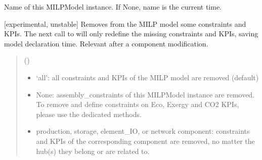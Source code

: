 \documentclass[letterpaper,10pt,english]{sphinxmanual}
\begin{document}
\begin{fulllineitems}
\begin{fulllineitems}
\end{fulllineitems}


\begin{fulllineitems}
\label{\detokenize{generated/tamos.MILPModel:tamos.MILPModel.name}}
\pysigstartsignatures
{}
\pysigstopsignatures
\sphinxAtStartPar
Name of this MILPModel instance. If None, name is the current time.

\end{fulllineitems}


\begin{fulllineitems}
\label{\detokenize{generated/tamos.MILPModel:tamos.MILPModel.remove_constraints_and_KPIs}}
\pysigstartsignatures
{}
\pysigstopsignatures
\sphinxAtStartPar
{[}experimental, unstable{]}
Removes from the MILP model some constraints and KPIs. The next call to 
will only redefine the missing constraints and KPIs, saving model declaration time.
Relevant after a component modification.
\begin{quote}\begin{description}
\sphinxAtStartPar
{} () \textendash{} \begin{itemize}
\item {} 
\sphinxAtStartPar
‘all’: all constraints and KPIs of the MILP model are removed (default)

\item {} 
\sphinxAtStartPar
None: assembly\_constraints of this MILPModel instance are removed.
To remove and define constraints on Eco, Exergy and CO2 KPIs, please use the dedicated methods.

\item {} 
\sphinxAtStartPar
production, storage, element\_IO, or network component: constraints and KPIs of the corresponding component
are removed, no matter the hub(s) they belong or are related to.


\end{itemize}
\end{description}
\end{quote}
\end{fulllineitems}
\end{fulllineitems}
\end{document}

